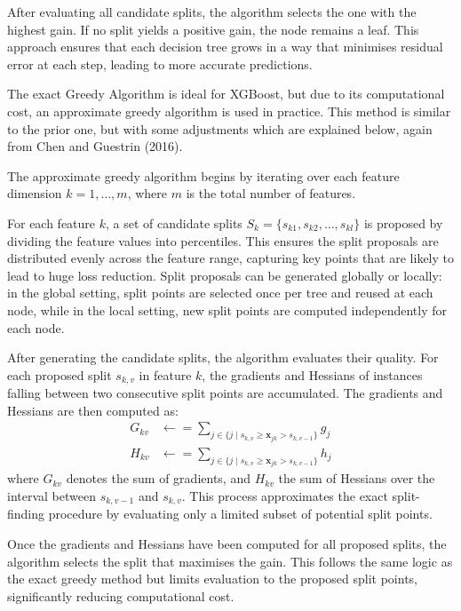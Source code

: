 \documentclass[11pt]{report} %
\begin{document}
After evaluating all candidate splits, the algorithm selects the one with the highest gain. If no split yields a positive gain, the node remains a leaf.
This approach ensures that each decision tree grows in a way that minimises residual error at each step, leading to more accurate predictions.\cite{chen2016xgboost}

The exact Greedy Algorithm is ideal for XGBoost, but due to its computational cost, an approximate greedy algorithm is used in practice. This method is similar to the prior one, but with some adjustments which are explained below, again from Chen and Guestrin (2016).

The approximate greedy algorithm begins by iterating over each feature dimension \( k = 1, \dots, m \), where \( m \) is the total number of features. 

For each feature \( k \), a set of candidate splits \( S_k = \{ s_{k1}, s_{k2}, \dots, s_{kl} \} \) is proposed by dividing the feature values into percentiles. This ensures the split proposals are distributed evenly across the feature range, capturing key points that are likely to lead to huge loss reduction. Split proposals can be generated globally or locally: in the global setting, split points are selected once per tree and reused at each node, while in the local setting, new split points are computed independently for each node.

After generating the candidate splits, the algorithm evaluates their quality. For each proposed split \( s_{k,v} \) in feature \( k \), the gradients and Hessians of instances falling between two consecutive split points are accumulated. The gradients and Hessians are then computed as:
\begin{align*}
G_{kv} &\gets =\textstyle \sum_{j \in \{ j \mid s_{k,v} \ge \mathbf{x}_{jk} > s_{k,v-1} \}} g_j \\
H_{kv} &\gets =\textstyle \sum_{j \in \{ j \mid s_{k,v} \ge \mathbf{x}_{jk} > s_{k,v-1} \}} h_j
\end{align*}
\noindent where \( G_{kv} \) denotes the sum of gradients, and \( H_{kv} \) the sum of Hessians over the interval between \( s_{k,v-1} \) and \( s_{k,v} \). This process approximates the exact split-finding procedure by evaluating only a limited subset of potential split points.

Once the gradients and Hessians have been computed for all proposed splits, the algorithm selects the split that maximises the gain. This follows the same logic as the exact greedy method but limits evaluation to the proposed split points, significantly reducing computational cost.\cite{chen2016xgboost}
\end{document}
